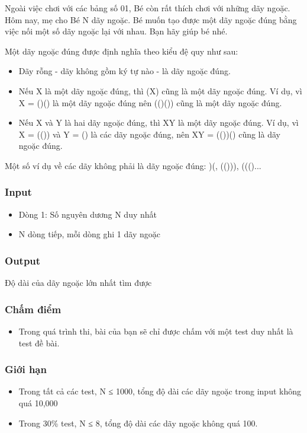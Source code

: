 



   Ngoài việc chơi với các bảng số 01, Bé còn rất thích chơi với những dãy ngoặc. Hôm nay, mẹ cho Bé N dãy ngoặc. Bé muốn tạo được một dãy ngoặc đúng bằng việc nối một số dãy ngoặc lại với nhau. Bạn hãy giúp bé nhé.  

   Một dãy ngoặc đúng được định nghĩa theo kiểu đệ quy như sau:  
\begin{itemize}
	\item     Dãy rỗng - dãy không gồm ký tự nào - là dãy ngoặc đúng.   
	\item     Nếu X là một dãy ngoặc đúng, thì (X) cũng là một dãy ngoặc đúng. Ví dụ, vì X = ()() là một dãy ngoặc đúng nên (()()) cũng là một dãy ngoặc đúng.   
	\item     Nếu X và Y là hai dãy ngoặc đúng, thì XY là một dãy ngoặc đúng. Ví dụ, vì X = (()) và Y = () là các dãy ngoặc đúng, nên XY = (())() cũng là dãy ngoặc đúng.   
\end{itemize}

   Một số ví dụ về các dãy không phải là dãy ngoặc đúng: )(, (())), ((()...  

\subsubsection{   Input  }
\begin{itemize}
	\item     Dòng 1: Số nguyên dương N duy nhất   
	\item     N dòng tiếp, mỗi dòng ghi 1 dãy ngoặc   
\end{itemize}

\subsubsection{   Output  }

   Độ dài của dãy ngoặc lớn nhất tìm được  

\subsubsection{   Chấm điểm  }
\begin{itemize}
	\item     Trong quá trình thi, bài của bạn sẽ chỉ được chấm với một test duy nhất là test đề bài.   
\end{itemize}

\subsubsection{   Giới hạn  }
\begin{itemize}
	\item     Trong tất cả các test, N ≤ 1000, tổng độ dài các dãy ngoặc trong input không quá 10,000   
	\item     Trong 30\% test, N ≤ 8, tổng độ dài các dãy ngoặc không quá 100.   
\end{itemize}

